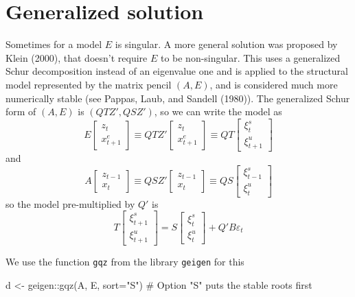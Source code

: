 \documentclass[
  letterpaper,
]{book}
\newenvironment{Shaded}{\begin{snugshade}}{\end{snugshade}}
\newcommand{\AttributeTok}[1]{\textcolor[rgb]{0.40,0.45,0.13}{#1}}
\newcommand{\CommentTok}[1]{\textcolor[rgb]{0.37,0.37,0.37}{#1}}
\newcommand{\FunctionTok}[1]{\textcolor[rgb]{0.28,0.35,0.67}{#1}}
\newcommand{\NormalTok}[1]{\textcolor[rgb]{0.00,0.23,0.31}{#1}}
\newcommand{\OtherTok}[1]{\textcolor[rgb]{0.00,0.23,0.31}{#1}}
\newcommand{\SpecialCharTok}[1]{\textcolor[rgb]{0.37,0.37,0.37}{#1}}
\newcommand{\StringTok}[1]{\textcolor[rgb]{0.13,0.47,0.30}{#1}}
\begin{document}
\hypertarget{generalized-solution}{%
\section{Generalized solution}\label{generalized-solution}}

Sometimes for a model \(E\) is singular. A more general solution was
proposed by Klein (2000), that doesn't require \(E\) to be non-singular.
This uses a generalized Schur decomposition instead of an eigenvalue one
and is applied to the structural model represented by the matrix pencil
\((A,E)\), and is considered much more numerically stable (see Pappas,
Laub, and Sandell (1980)). The generalized Schur form of \((A,E)\) is
\((QTZ', QSZ')\), so we can write the model as \[
E \begin{bmatrix} z_t \\ x_{t+1}^e \end{bmatrix} \equiv QTZ' \begin{bmatrix} z_t \\ x_{t+1}^e \end{bmatrix} \equiv QT \begin{bmatrix} \xi_t^s \\ \xi_{t+1}^u \end{bmatrix} 
\] and \[
A \begin{bmatrix} z_{t-1} \\ x_t \end{bmatrix} \equiv QSZ' \begin{bmatrix} z_{t-1} \\ x_t \end{bmatrix} \equiv QS\begin{bmatrix} \xi_{t-1}^s \\ \xi_t^u \end{bmatrix} 
\] so the model pre-multiplied by \(Q'\) is \[
T \begin{bmatrix} \xi_{t+1}^s \\ \xi_{t+1}^u \end{bmatrix} = S \begin{bmatrix} \xi_t^s \\ \xi_t^u \end{bmatrix} + Q'B\varepsilon_t
\]

We use the function \texttt{gqz} from the library \texttt{geigen} for
this

\begin{Shaded}
\begin{Highlighting}[]
\NormalTok{d }\OtherTok{\textless{}{-}}\NormalTok{ geigen}\SpecialCharTok{::}\FunctionTok{gqz}\NormalTok{(A, E, }\AttributeTok{sort=}\StringTok{"S"}\NormalTok{) }\CommentTok{\# Option "S" puts the stable roots first}
\end{Highlighting}
\end{Shaded}
\end{document}
